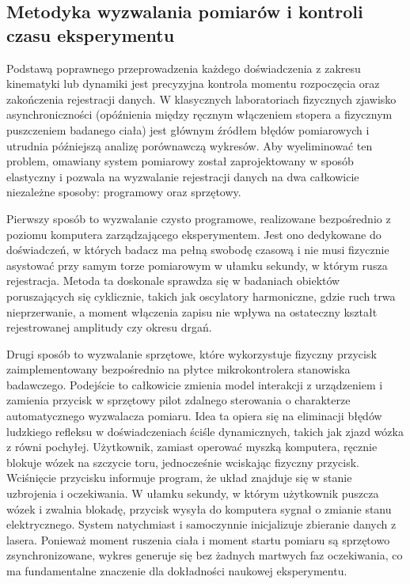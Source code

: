 \documentclass[a4paper,12pt]{article}
\begin{document}
\subsection{Metodyka wyzwalania pomiarów i kontroli czasu eksperymentu}

\noindent Podstawą poprawnego przeprowadzenia każdego doświadczenia z zakresu kinematyki lub dynamiki jest precyzyjna kontrola momentu rozpoczęcia oraz zakończenia rejestracji danych. W klasycznych laboratoriach fizycznych zjawisko asynchroniczności (opóźnienia między ręcznym włączeniem stopera a fizycznym puszczeniem badanego ciała) jest głównym źródłem błędów pomiarowych i utrudnia późniejszą analizę porównawczą wykresów. Aby wyeliminować ten problem, omawiany system pomiarowy został zaprojektowany w sposób elastyczny i pozwala na wyzwalanie rejestracji danych na dwa całkowicie niezależne sposoby: programowy oraz sprzętowy.

\vspace{0.3cm}
\noindent Pierwszy sposób to wyzwalanie czysto programowe, realizowane bezpośrednio z poziomu komputera zarządzającego eksperymentem. Jest ono dedykowane do doświadczeń, w których badacz ma pełną swobodę czasową i nie musi fizycznie asystować przy samym torze pomiarowym w ułamku sekundy, w którym rusza rejestracja. Metoda ta doskonale sprawdza się w badaniach obiektów poruszających się cyklicznie, takich jak oscylatory harmoniczne, gdzie ruch trwa nieprzerwanie, a moment włączenia zapisu nie wpływa na ostateczny kształt rejestrowanej amplitudy czy okresu drgań.

\vspace{0.3cm}
\noindent Drugi sposób to wyzwalanie sprzętowe, które wykorzystuje fizyczny przycisk zaimplementowany bezpośrednio na płytce mikrokontrolera stanowiska badawczego. Podejście to całkowicie zmienia model interakcji z urządzeniem i zamienia przycisk w sprzętowy pilot zdalnego sterowania o charakterze automatycznego wyzwalacza pomiaru. Idea ta opiera się na eliminacji błędów ludzkiego refleksu w doświadczeniach ściśle dynamicznych, takich jak zjazd wózka z równi pochyłej. Użytkownik, zamiast operować myszką komputera, ręcznie blokuje wózek na szczycie toru, jednocześnie wciskając fizyczny przycisk. Wciśnięcie przycisku informuje program, że układ znajduje się w stanie uzbrojenia i oczekiwania. W ułamku sekundy, w którym użytkownik puszcza wózek i zwalnia blokadę, przycisk wysyła do komputera sygnał o zmianie stanu elektrycznego. System natychmiast i samoczynnie inicjalizuje zbieranie danych z lasera. Ponieważ moment ruszenia ciała i moment startu pomiaru są sprzętowo zsynchronizowane, wykres generuje się bez żadnych martwych faz oczekiwania, co ma fundamentalne znaczenie dla dokładności naukowej eksperymentu.
\end{document}
